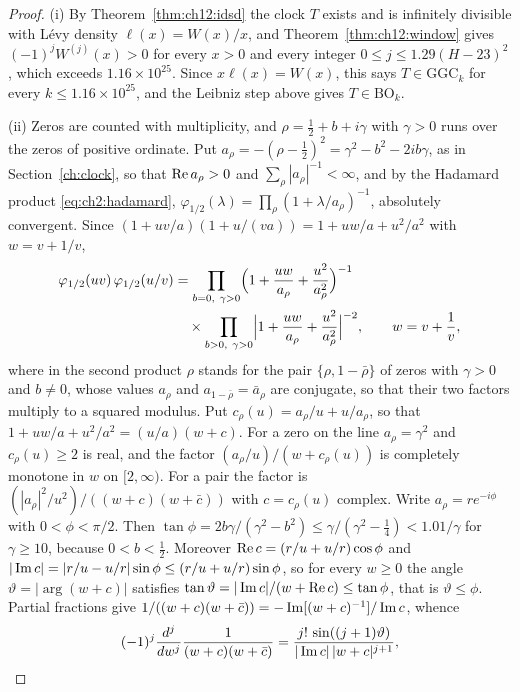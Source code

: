 \begin{proof}
(i) By Theorem~\ref{thm:ch12:idsd} the clock $T$ exists and is infinitely divisible with L\'evy density $\ell(x)=W(x)/x$, and Theorem~\ref{thm:ch12:window} gives $(-1)^jW^{(j)}(x)>0$ for every $x>0$ and every integer $0\leq j\leq1.29(H-23)^2$, which exceeds $1.16\times10^{25}$. Since $x\ell(x)=W(x)$, this says $T\in\mathrm{GGC}_k$ for every $k\leq1.16\times10^{25}$, and the Leibniz step above gives $T\in\mathrm{BO}_k$.

(ii) Zeros are counted with multiplicity, and $\rho=\tfrac12+b+i\gamma$ with $\gamma>0$ runs over the zeros of positive ordinate. Put $a_\rho=-(\rho-\tfrac12)^2=\gamma^2-b^2-2ib\gamma$, as in Section~\ref{ch:clock}, so that $\operatorname{Re} a_\rho>0$ and $\sum_\rho|a_\rho|^{-1}<\infty$, and by the Hadamard product \eqref{eq:ch2:hadamard}, $\varphi_{1/2}(\lambda)=\prod_\rho(1+\lambda/a_\rho)^{-1}$, absolutely convergent. Since $(1+uv/a)(1+u/(va))=1+uw/a+u^2/a^2$ with $w=v+1/v$,
\[
\begin{aligned}
\varphi_{1/2}(uv)\,\varphi_{1/2}(u/v)&=\prod_{b=0,\ \gamma>0}\Bigl(1+\frac{uw}{a_\rho}+\frac{u^2}{a_\rho^2}\Bigr)^{-1}\\
&\quad\times\prod_{b>0,\ \gamma>0}\Bigl|1+\frac{uw}{a_\rho}+\frac{u^2}{a_\rho^2}\Bigr|^{-2},\qquad w=v+\frac1v,
\end{aligned}
\]
where in the second product $\rho$ stands for the pair $\{\rho,1-\bar\rho\}$ of zeros with $\gamma>0$ and $b\neq0$, whose values $a_\rho$ and $a_{1-\bar\rho}=\bar a_\rho$ are conjugate, so that their two factors multiply to a squared modulus. Put $c_\rho(u)=a_\rho/u+u/a_\rho$, so that $1+uw/a+u^2/a^2=(u/a)(w+c)$. For a zero on the line $a_\rho=\gamma^2$ and $c_\rho(u)\geq2$ is real, and the factor $(a_\rho/u)/(w+c_\rho(u))$ is completely monotone in $w$ on $[2,\infty)$. For a pair the factor is $(|a_\rho|^2/u^2)/((w+c)(w+\bar c))$ with $c=c_\rho(u)$ complex. Write $a_\rho=re^{-i\phi}$ with $0<\phi<\pi/2$. Then $\tan\phi=2b\gamma/(\gamma^2-b^2)\leq\gamma/(\gamma^2-\tfrac14)<1.01/\gamma$ for $\gamma\geq10$, because $0<b<\tfrac12$. Moreover $\operatorname{Re} c=(r/u+u/r)\cos\phi$ and $|\operatorname{Im} c|=|r/u-u/r|\sin\phi\leq(r/u+u/r)\sin\phi$, so for every $w\geq0$ the angle $\vartheta=|\arg(w+c)|$ satisfies $\tan\vartheta=|\operatorname{Im} c|/(w+\operatorname{Re} c)\leq\tan\phi$, that is $\vartheta\leq\phi$. Partial fractions give $1/((w+c)(w+\bar c))=-\operatorname{Im}[(w+c)^{-1}]/\operatorname{Im} c$, whence
\[
(-1)^j\frac{d^j}{dw^j}\frac1{(w+c)(w+\bar c)}=\frac{j!\,\sin((j+1)\vartheta)}{|\operatorname{Im} c|\,|w+c|^{j+1}},
\]

\end{proof}
